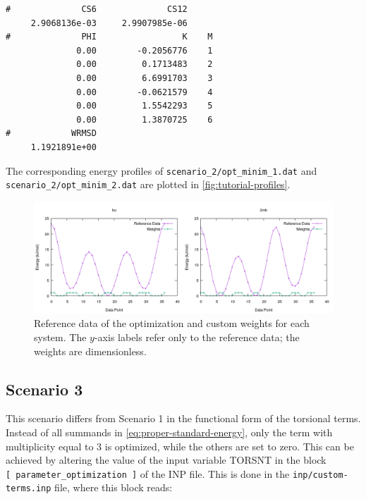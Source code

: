 \documentclass[10pt,a4paper]{report}
\numberwithin{equation}{section}
\newcommand{\under}{\_}
\begin{document}
\begin{lstlisting}
#              CS6              CS12
     2.9068136e-03     2.9907985e-06
#              PHI                 K    M
              0.00        -0.2056776    1
              0.00         0.1713483    2
              0.00         6.6991703    3
              0.00        -0.0621579    4
              0.00         1.5542293    5
              0.00         1.3870725    6
#            WRMSD
     1.1921891e+00
\end{lstlisting}\vspace{-2ex}\par

\noindent The corresponding energy profiles of
\texttt{scenario\under{}2/opt\under{}minim\under{}1.dat} and
\texttt{scenario\under{}2/opt\under{}minim\under{}2.dat} are plotted
in \autoref{fig:tutorial-profiles}.

\begin{figure}[tb]
  \centering
  \includegraphics[width=\textwidth]{qm-and-weis}
  \caption{Reference data of the optimization and custom weights for
    each system. The $y$-axis labels refer only to the reference data;
    the weights are dimensionless.}
  \label{fig:qm-and-wei}
\end{figure}

\subsection{Scenario 3}
\label{sec:tutorial-scenario-3}

This scenario differs from Scenario 1 in the functional form of the
torsional terms.
%
Instead of all summands in \autoref{eq:proper-standard-energy}, only
the term with multiplicity equal to 3 is optimized, while the others
are set to zero.
%
This can be achieved by altering the value of the input variable
TORSNT in the block \texttt{[~parameter\under{}optimization~]} of the
INP file.
%
This is done in the \texttt{inp/custom-terms.inp} file, where this
block reads:
\end{document}

